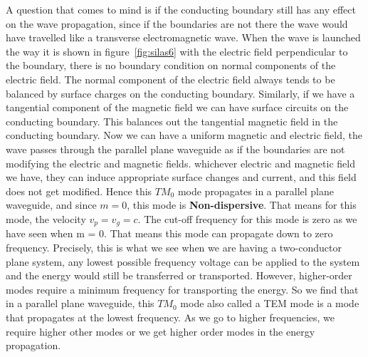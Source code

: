 A question that comes to mind is if the conducting boundary still has any effect on the wave propagation, since if the boundaries are not there the wave would have travelled like a transverse electromagnetic wave. When the wave is launched the way it is shown in figure~\ref{fig:silas6} with the electric field perpendicular to the boundary, there is no boundary condition on normal components of the electric field. The normal component of the electric field always tends to be balanced by surface charges on the conducting boundary. Similarly, if we have a tangential component of the magnetic field we can have surface circuits on the conducting boundary. This balances out the tangential magnetic field in the conducting boundary. Now we can have a uniform magnetic and electric field, the wave passes through the parallel plane waveguide as if the boundaries are not modifying the electric and magnetic fields. whichever electric and magnetic field we have, they can induce appropriate surface changes and current, and this field does not get modified. Hence this $TM_0$ mode propagates in a parallel plane waveguide, and since $m = 0$, this mode is \textbf{Non-dispersive}. That means for this mode, the velocity $v_{p}=v_{g}=c$. The cut-off frequency for this mode is zero as we have seen when m = 0. That means this mode can propagate down to zero frequency. Precisely, this is what we see when we are having a two-conductor plane system, any lowest possible frequency voltage can be applied to the system and the energy would still be transferred or transported. However, higher-order modes require a minimum frequency for transporting the energy. So we find that in a parallel plane waveguide, this $TM_0$ mode also called a TEM mode is a mode that propagates at the lowest frequency. As we go to higher frequencies, we require higher other modes or we get higher order modes in the energy propagation.
